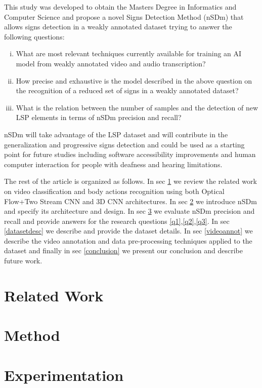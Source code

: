 \documentclass[twocolumn]{article}
\begin{document}
This study was developed to obtain the Masters Degree in Informatics and Computer Science and propose a novel Signs Detection Method (nSDm) that allows signs detection in a weakly annotated dataset trying to answer the following questions:

\begin{enumerate}[(i)]
\item What are most relevant techniques currently available for training an AI model from weakly annotated video and audio transcription?\label{q1}
\item How precise and exhaustive is the model described in the above question on the recognition of a reduced set of signs in a weakly annotated dataset?\label{q2}
\item What is the relation between the number of samples and the detection of new LSP elements in terms of nSDm precision and recall?\label{q3}
\end{enumerate}

nSDm will take advantage of the LSP dataset \cite{lsp_dataset} and will contribute in the generalization and progressive signs detection and could be used as a starting point for future studies including software accessibility improvements and human computer interaction for people with deafness and hearing limitations.

The rest of the article is organized as follows. In sec \ref{relatedwork} we review the related work on video classification and body actions recognition using both Optical Flow+Two Stream CNN and 3D CNN architectures. In sec \ref{method} we introduce nSDm and specify its architecture and design. In sec \ref{experimentation} we evaluate nSDm precision and recall and provide answers for the research questions \ref{q1},\ref{q2},\ref{q3}. In sec \ref{datasetdesc} we describe and provide the dataset details. In sec \ref{videoannot} we describe the video annotation and data pre-processing techniques applied to the dataset and finally in sec \ref{conclusion} we present our conclusion and describe future work.
\section{Related Work} \label{relatedwork}
\section{Method}\label{method}
\section{Experimentation}\label{experimentation}
\end{document}
